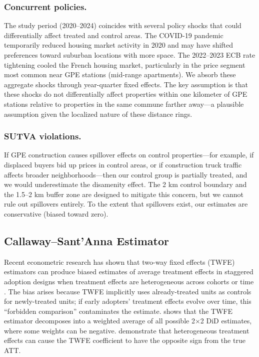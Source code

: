 \documentclass[12pt]{article}
\begin{document}
\subsubsection{Concurrent policies.}
The study period (2020--2024) coincides with several policy shocks that could differentially affect treated and control areas. The COVID-19 pandemic temporarily reduced housing market activity in 2020 and may have shifted preferences toward suburban locations with more space. The 2022--2023 ECB rate tightening cooled the French housing market, particularly in the price segment most common near GPE stations (mid-range apartments). We absorb these aggregate shocks through year-quarter fixed effects. The key assumption is that these shocks do not differentially affect properties within one kilometer of GPE stations relative to properties in the same commune farther away---a plausible assumption given the localized nature of these distance rings.

\subsubsection{SUTVA violations.}
If GPE construction causes spillover effects on control properties---for example, if displaced buyers bid up prices in control areas, or if construction truck traffic affects broader neighborhoods---then our control group is partially treated, and we would underestimate the disamenity effect. The 2 km control boundary and the 1.5--2 km buffer zone are designed to mitigate this concern, but we cannot rule out spillovers entirely. To the extent that spillovers exist, our estimates are conservative (biased toward zero).

\subsection{Callaway--Sant'Anna Estimator}

Recent econometric research has shown that two-way fixed effects (TWFE) estimators can produce biased estimates of average treatment effects in staggered adoption designs when treatment effects are heterogeneous across cohorts or time \citep{goodman2021difference, dechaisemartin2020two, callaway2021difference, sun2021estimating, borusyak2024revisiting}. The bias arises because TWFE implicitly uses already-treated units as controls for newly-treated units; if early adopters' treatment effects evolve over time, this ``forbidden comparison'' contaminates the estimate. \citet{goodman2021difference} shows that the TWFE estimator decomposes into a weighted average of all possible 2$\times$2 DiD estimates, where some weights can be negative. \citet{dechaisemartin2020two} demonstrate that heterogeneous treatment effects can cause the TWFE coefficient to have the opposite sign from the true ATT.
\end{document}
